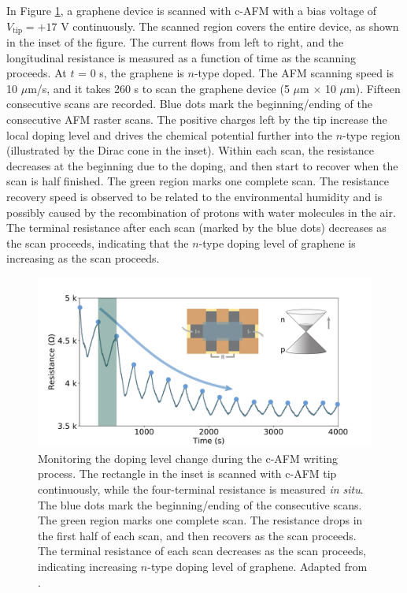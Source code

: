 \documentclass[pdflatex, sectionletters, 12pt]{pittetd}    %
\begin{document}
In Figure \ref{FIG:WritingResistance}, a graphene device is scanned with c-AFM with a bias voltage of $V_\mathrm{tip} = +17$ V continuously. The scanned region covers the entire device, as shown in the inset of the figure. The current flows from left to right, and the longitudinal resistance is measured as a function of time as the scanning proceeds. At $t$ = 0 s, the graphene is $n$-type doped. The AFM scanning speed is 10 $\mu$m/s, and it takes 260 s to scan the graphene device (5 $\mu$m $\times$ 10 $\mu$m). Fifteen consecutive scans are recorded. Blue dots mark the beginning/ending of the consecutive AFM raster scans. The positive charges left by the tip increase the local doping level and drives the chemical potential further into the $n$-type region (illustrated by the Dirac cone in the inset). Within each scan, the resistance decreases at the beginning due to the doping, and then start to recover when the scan is half finished. The green region marks one complete scan. The resistance recovery speed is observed to be related to the environmental humidity and is possibly caused by the recombination of protons with water molecules in the air. The terminal resistance after each scan (marked by the blue dots) decreases as the scan proceeds, indicating that the $n$-type doping level of graphene is increasing as the scan proceeds.
\\

\begin{figure}[h!]
	\centering
	\includegraphics[width=1\textwidth]{Drawing/WritingResistance.pdf}
	\caption{Monitoring the doping level change during the c-AFM writing process. The rectangle in the inset is scanned with c-AFM tip continuously, while the four-terminal resistance is measured \textit{in situ}. The blue dots mark the beginning/ending of the consecutive scans. The green region marks one complete scan. The resistance drops in the first half of each scan, and then recovers as the scan proceeds. The terminal resistance of each scan decreases as the scan proceeds, indicating increasing $n$-type doping level of graphene. Adapted from \cite{li2019reconfigurable}.}
	\label{FIG:WritingResistance}
\end{figure}
\end{document}
